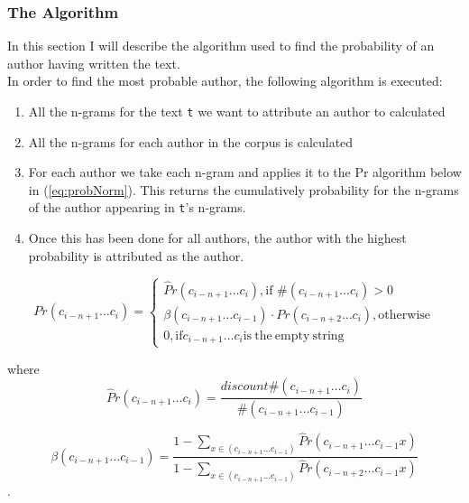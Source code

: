 \subsubsection{The Algorithm}
In this section I will describe the algorithm used to find the probability of an author having written the text.\\

In order to find the most probable author, the following algorithm is executed:

\begin{enumerate}
\item All the n-grams for the text \texttt{t} we want to attribute an author to calculated
\item All the n-grams for each author in the corpus is calculated
\item For each author we take each n-gram and applies it to the Pr algorithm below in (\ref{eq:probNorm}). This returns the cumulatively probability for the n-grams of the author appearing in \texttt{t}'s n-grams. 
\item Once this has been done for all authors, the author with the highest probability is attributed as the author.
\end{enumerate}

\begin{equation}
\label{eq:probNorm}
Pr(c_{i - n + 1} \ldots c_{i}) = \left\{
\begin{array}{rl}
\hat{P}r(c_{i - n + 1} \ldots c_{i}), \text{if } \#(c_{i - n + 1} \ldots c_{i}) > 0\\
\beta(c_{i - n + 1} \ldots c_{i-1}) \cdot Pr(c_{i - n + 2} \ldots c_{i}), \mathrm{otherwise}\\
0, \mathrm{if} c_{i-n+1}\ldots c_i \mathrm{is\ the\ empty\ string}
\end{array} \right.
\end{equation}

where 
\begin{equation}
\label{eq:probHat}
\hat{P}r(c_{i - n + 1} \ldots c_{i}) = \frac{discount \#(c_{i - n + 1} \ldots c_{i})}{\#(c_{i - n + 1} \ldots c_{i-1})}
\end{equation}

\begin{equation}
\label{eq:beta}
\beta(c_{i - n + 1} \ldots c_{i-1}) = 
\frac
{1 - \sum_{x \in (c_{i - n + 1} \ldots c_{i-1})}\hat{P}r(c_{i - n + 1} \ldots c_{i-1} x)}
{1 - \sum_{x \in (c_{i - n + 1} \ldots c_{i-1})}\hat{P}r(c_{i - n + 2} \ldots c_{i-1} x)}
\end{equation}.

